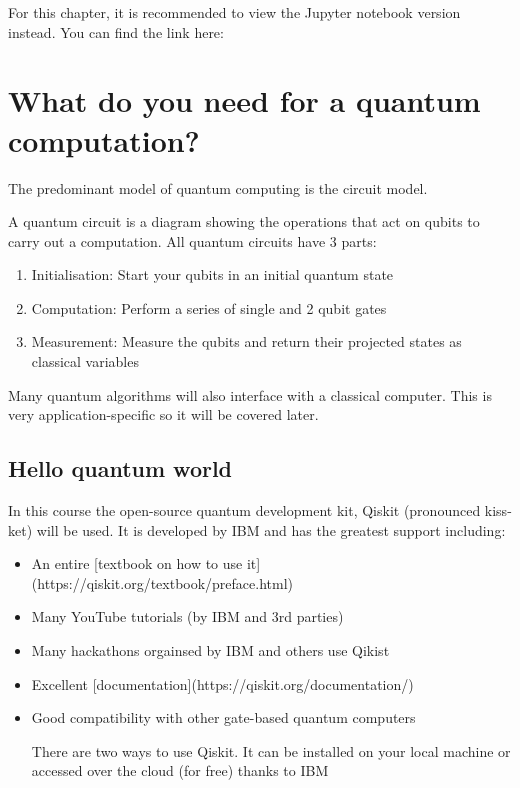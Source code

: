 \documentclass{book}
\begin{document}
For this chapter, it is recommended to view the Jupyter notebook version instead. You can find the link here: 



\section{What do you need for a quantum computation?}

The predominant model of quantum computing is the circuit model. 

A quantum circuit is a diagram showing the operations that act on qubits to carry out a computation. All quantum circuits have 3 parts:

\begin{enumerate}
    \item Initialisation: Start your qubits in an initial quantum state
    \item Computation: Perform a series of single and 2 qubit gates
    \item Measurement: Measure the qubits and return their projected states as classical variables
\end{enumerate}


Many quantum algorithms will also interface with a classical computer. This is very application-specific so it will be covered later. 


\subsection{Hello quantum world}

In this course the open-source quantum development kit, Qiskit (pronounced kiss-ket) will be used. It is developed by IBM and has the greatest support including: 

\begin{itemize}

    \item An entire [textbook on how to use it](https://qiskit.org/textbook/preface.html) 
    \item Many YouTube tutorials (by IBM and 3rd parties)
    \item Many hackathons orgainsed by IBM and others use Qikist
    \item Excellent [documentation](https://qiskit.org/documentation/) 
    \item Good compatibility with other gate-based quantum computers

There are two ways to use Qiskit. It can be installed on your local machine or accessed over the cloud (for free) thanks to IBM
\end{itemize}
\end{document}
